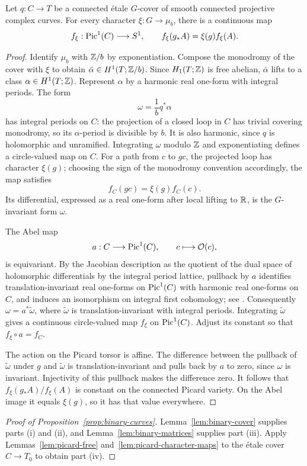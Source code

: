\begin{lemma}\label{lem:picard-character-maps}
Let \(q:C\to T\) be a connected \'etale \(G\)-cover of smooth
connected projective complex curves.  For every character
\(\xi:G\to\mu_b\), there is a continuous map
\[
 f_\xi:\operatorname{Pic}^1(C)\longrightarrow S^1,\qquad
 f_\xi(g_*A)=\xi(g)f_\xi(A).
\]
\end{lemma}

\begin{proof}
Identify \(\mu_b\) with \(\mathbb Z/b\) by exponentiation.
Compose the monodromy of the cover with \(\xi\) to obtain
\(\bar\alpha\in H^1(T;\mathbb Z/b)\).
Since \(H_1(T;\mathbb Z)\) is free abelian, \(\bar\alpha\) lifts
to a class \(\alpha\in H^1(T;\mathbb Z)\).
Represent \(\alpha\) by a harmonic real one-form with
integral periods.  The form
\[
 \omega=\frac1b q^*\alpha
\]
has integral periods on \(C\): the projection of a closed
loop in \(C\) has trivial covering monodromy, so its
\(\alpha\)-period is divisible by \(b\).
It is also harmonic, since \(q\) is holomorphic and
unramified.  Integrating \(\omega\) modulo \(\mathbb Z\) and
exponentiating defines a circle-valued map on \(C\).
For a path from \(c\) to \(gc\), the projected loop has
character \(\xi(g)\); choosing the sign of the monodromy
convention accordingly, the map satisfies
\[
 f_C(gc)=\xi(g)f_C(c).
\]
Its differential, expressed as a real one-form after local
lifting to \(\mathbb R\), is the \(G\)-invariant form \(\omega\).

The Abel map
\[
 a:C\longrightarrow\operatorname{Pic}^1(C),\qquad c\longmapsto\mathcal O(c),
\]
is equivariant.  By the Jacobian description as the
quotient of the dual space of holomorphic differentials
by the integral period lattice, pullback by \(a\)
identifies translation-invariant real one-forms on
\(\operatorname{Pic}^1(C)\) with harmonic real one-forms on \(C\),
and induces an isomorphism on integral first cohomology;
see \cite[Proposition~2.2 and Theorem~2.5]{MilneJacobian}.
Consequently \(\omega=a^*\widetilde\omega\), where
\(\widetilde\omega\) is translation-invariant with integral
periods.  Integrating \(\widetilde\omega\) gives a continuous
circle-valued map \(f_\xi\) on \(\operatorname{Pic}^1(C)\).  Adjust its
constant so that \(f_\xi\circ a=f_C\).

The action on the Picard torsor is affine.  The difference
between the pullback of \(\widetilde\omega\) under \(g\)
and \(\widetilde\omega\) is translation-invariant and pulls
back by \(a\) to zero, since \(\omega\) is invariant.
Injectivity of this pullback makes the difference zero.
It follows that \(f_\xi(g_*A)/f_\xi(A)\) is constant on the
connected Picard variety.  On the Abel image it equals
\(\xi(g)\), so it has that value everywhere.
\end{proof}

\begin{proof}[Proof of Proposition~\ref{prop:binary-curves}]
Lemma~\ref{lem:binary-cover} supplies parts \textup{(i)}
and \textup{(ii)}, and Lemma~\ref{lem:binary-matrices}
supplies part \textup{(iii)}.
Apply Lemmas~\ref{lem:picard-free}
and~\ref{lem:picard-character-maps} to the \'etale cover
\(C\to T_0\) to obtain part \textup{(iv)}.
\end{proof}
